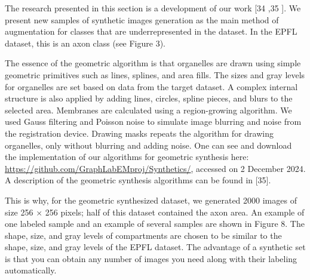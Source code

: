 \documentclass[journal,article,submit,pdftex,moreauthors]{Definitions/mdpi}
\begin{document}
The research presented in this section is a development of our work [34 ,35 ]. We present new samples of synthetic images generation as the main method of augmentation for classes that are underrepresented in the dataset. In the EPFL dataset, this is an axon class (see Figure 3).

The essence of the geometric algorithm is that organelles are drawn using simple geometric primitives such as lines, splines, and area fills. The sizes and gray levels for organelles are set based on data from the target dataset. A complex internal structure is also applied by adding lines, circles, spline pieces, and blurs to the selected area. Membranes are calculated using a region-growing algorithm. We used Gauss filtering and Poisson noise to simulate image blurring and noise from the registration device. Drawing masks repeats the algorithm for drawing organelles, only without blurring and adding noise. One can see and download the implementation of our algorithms for geometric synthesis here: \href{https://github.com/GraphLabEMproj/Synthetics/}{https://github.com/GraphLabEMproj/Synthetics/}, accessed on 2 December 2024. A description of the geometric synthesis algorithms can be found in [35].

This is why, for the geometric synthesized dataset, we generated 2000 images of size 256 × 256 pixels; half of this dataset contained the axon area. An example of one labeled sample and an example of several samples are shown in Figure 8. The shape, size, and gray levels of compartments are chosen to be similar to the shape, size, and gray levels of the EPFL dataset. The advantage of a synthetic set is that you can obtain any number of images you need along with their labeling automatically.
\end{document}

